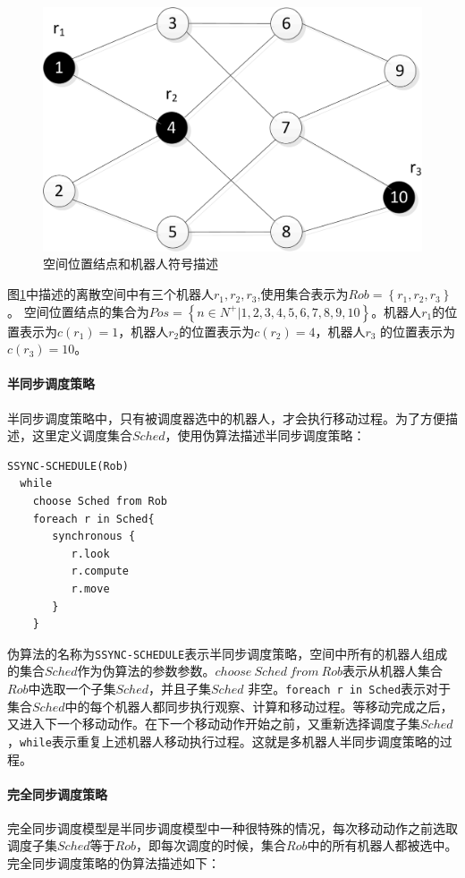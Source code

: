 \begin{figure}[!hbt]
	\centering
	\includegraphics[width=2 in]{fig/robcollection.png}
	\caption{空间位置结点和机器人符号描述}
	\label{fig:robcollection}
\end{figure}

图\ref{fig:robcollection}中描述的离散空间中有三个机器人$r_1,r_2,r_3$,使用集合表示为$Rob =\left\{r_1,r_2,r_3\right\}$。 空间位置结点的集合为$Pos =\left\{n \in N^+ |1,2,3,4,5,6,7,8,9,10\right\}$。机器人$r_1$的位置表示为$c\left(r_1\right) = 1$，机器人$r_2$的位置表示为$c\left(r_2\right) = 4$，机器人$r_3$ 的位置表示为$c\left(r_3\right) = 10$。

\paragraph{半同步调度策略}
半同步调度策略中，只有被调度器选中的机器人，才会执行移动过程。为了方便描述，这里定义调度集合$Sched$，使用伪算法描述半同步调度策略：

\begin{lstlisting}
SSYNC-SCHEDULE(Rob)
  while
    choose Sched from Rob
    foreach r in Sched{
       synchronous {
          r.look
          r.compute
          r.move
       }
    }
\end{lstlisting}

伪算法的名称为\verb|SSYNC-SCHEDULE|表示半同步调度策略，空间中所有的机器人组成的集合$Sched$作为伪算法的参数参数。$choose \ Sched \ from \ Rob$表示从机器人集合$Rob$中选取一个子集$Sched$，并且子集$Sched$ 非空。\verb|foreach r in Sched|表示对于集合$Sched$中的每个机器人都同步执行观察、计算和移动过程。等移动完成之后，又进入下一个移动动作。在下一个移动动作开始之前，又重新选择调度子集$Sched$，\verb|while|表示重复上述机器人移动执行过程。这就是多机器人半同步调度策略的过程。

\paragraph{完全同步调度策略}
完全同步调度模型是半同步调度模型中一种很特殊的情况，每次移动动作之前选取调度子集$Sched$等于$Rob$，即每次调度的时候，集合$Rob$中的所有机器人都被选中。完全同步调度策略的伪算法描述如下：

